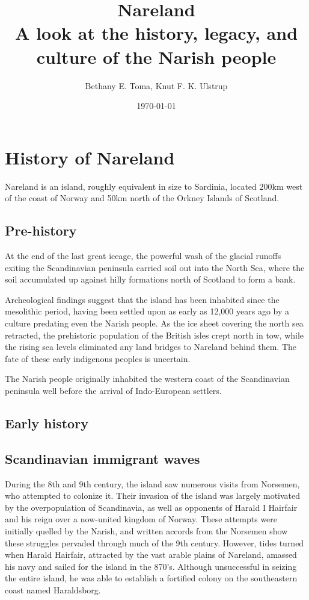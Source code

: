\documentclass[a4paper,11pt,twoside,openright]{memoir}
\title{{\fontsize{100}{100}\selectfont Nareland} \\ \Huge \sffamily A look at the history, legacy, and culture of the Narish people}
\author{Bethany E. Toma, Knut F. K. Ulstrup}
\date{\today}
\begin{document}
\maketitle

\part{History of Nareland}

Nareland is an island, roughly equivalent in size to Sardinia, located 200km west of the coast of Norway and 50km north of the Orkney Islands of Scotland.

\chapter{Pre-history}

At the end of the last great iceage, the powerful wash of the glacial runoffs exiting the Scandinavian peninsula carried soil out into the North Sea, where the soil accumulated up against hilly formations north of Scotland to form a bank.

Archeological findings suggest that the island has been inhabited since the mesolithic period, having been settled upon as early as 12,000 years ago by a culture predating even the Narish people. As the ice sheet covering the north sea retracted, the prehistoric population of the British isles crept north in tow, while the rising sea levels eliminated any land bridges to Nareland behind them. The fate of these early indigenous peoples is uncertain.

The Narish people originally inhabited the western coast of the Scandinavian peninsula well before the arrival of Indo-European settlers. 

\chapter{Early history}



\chapter{Scandinavian immigrant waves}

During the 8th and 9th century, the island saw numerous visits from Norsemen, who attempted to colonize it. Their invasion of the island was largely motivated by the overpopulation of Scandinavia, as well as opponents of Harald I Hairfair and his reign over a now-united kingdom of Norway. These attempts were initially quelled by the Narish, and written accords from the Norsemen show these struggles pervaded through much of the 9th century. However, tides turned when Harald Hairfair, attracted by the vast arable plains of Nareland, amassed his navy and sailed for the island in the 870's. Although unsuccessful in seizing the entire island, he was able to establish a fortified colony on the southeastern coast named Haraldsborg. 
\end{document}
